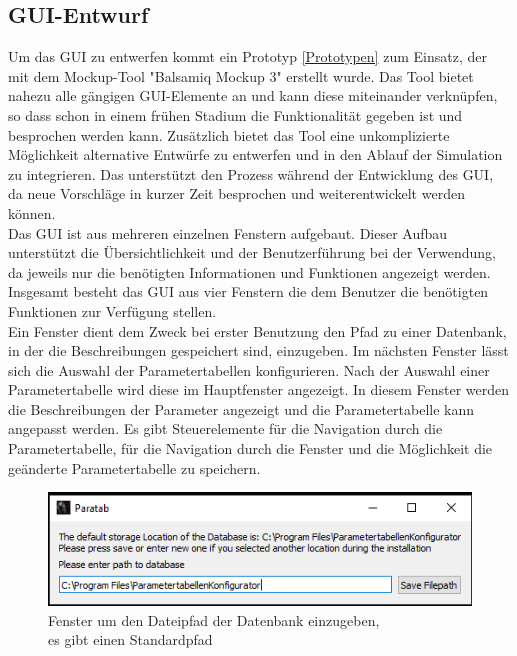 \documentclass[12pt,a4paper]{article}
\begin{document}
\subsection{GUI-Entwurf}
Um das GUI zu entwerfen kommt ein Prototyp \ref{Prototypen} zum Einsatz, der mit dem Mockup-Tool "Balsamiq Mockup 3" erstellt wurde. Das Tool bietet nahezu alle gängigen GUI-Elemente an und kann diese miteinander verknüpfen, so dass schon in einem frühen Stadium die Funktionalität gegeben ist und besprochen werden kann. Zusätzlich bietet das Tool eine unkomplizierte Möglichkeit alternative Entwürfe zu entwerfen und in den Ablauf der Simulation zu integrieren. Das unterstützt den Prozess während der Entwicklung des GUI, da neue Vorschläge in kurzer Zeit besprochen und weiterentwickelt werden können.\\
\newline
Das GUI ist aus mehreren einzelnen Fenstern aufgebaut. Dieser Aufbau unterstützt die Übersichtlichkeit und der Benutzerführung bei der Verwendung, da jeweils nur die benötigten Informationen und Funktionen angezeigt werden.\\ 
Insgesamt besteht das GUI aus vier Fenstern die dem Benutzer die benötigten Funktionen zur Verfügung stellen. \\
Ein Fenster dient dem Zweck bei erster Benutzung den Pfad zu einer Datenbank, in der die Beschreibungen gespeichert sind, einzugeben. Im nächsten Fenster lässt sich die Auswahl der Parametertabellen konfigurieren. Nach der Auswahl einer Parametertabelle wird diese im Hauptfenster angezeigt. In diesem Fenster werden die Beschreibungen der Parameter angezeigt und die Parametertabelle kann angepasst werden. Es gibt Steuerelemente für die Navigation durch die Parametertabelle, für die Navigation durch die Fenster und die Möglichkeit die geänderte Parametertabelle zu speichern.\\
\begin{figure}[H]
\includegraphics[scale=1]{pictures_and_research/Bilder/filepathWindow.PNG}
\caption{Fenster um den Dateipfad der Datenbank einzugeben,\\
es gibt einen Standardpfad}
\end{figure}
\end{document}
